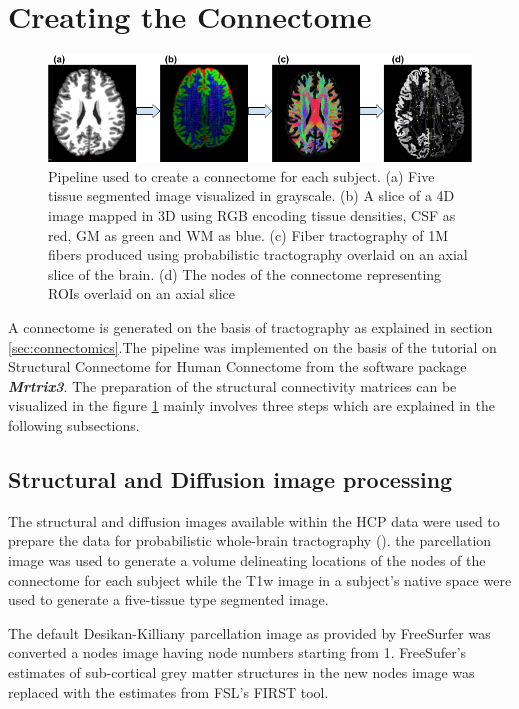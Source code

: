 \documentclass[msthesis.tex]{subfiles}
\begin{document}
\section{Creating the Connectome}
\begin{figure}
    \centering
    \includegraphics[width=\textwidth]{images/Preprocessing_pipeline.png}
    \caption{Pipeline used to create a connectome for each subject. (a) Five tissue segmented image visualized in grayscale. (b) A slice of a 4D image mapped in 3D using RGB encoding tissue densities, CSF as red, GM as green and WM as blue. (c) Fiber tractography of 1M fibers produced using probabilistic tractography overlaid on an axial slice of the brain. (d) The nodes of the connectome representing ROIs overlaid on an axial slice}
    \label{fig:preproc}
\end{figure}
A connectome is generated on the basis of tractography as explained in section \ref{sec:connectomics}.The pipeline was implemented on the basis of the tutorial on Structural Connectome for Human Connectome from the software package \textbf{\textit{Mrtrix3}}. The preparation of the structural connectivity matrices can be visualized in the figure \ref{fig:preproc} mainly involves three steps which are explained in the following subsections.

\subsection{Structural  and Diffusion image processing}
\label{subsec:struct_diff}

The structural and diffusion images available within the HCP data were used to prepare the data for probabilistic whole-brain tractography (\cite{parker2003framework}). the parcellation image was used to generate a volume delineating locations of the nodes of the connectome for each subject while the T1w image in a subject's native space were used to generate a five-tissue type segmented image.

The default Desikan-Killiany parcellation image as provided by FreeSurfer was converted a nodes image having node numbers starting from 1. FreeSufer's estimates of sub-cortical grey matter structures in the new nodes image was replaced with the estimates from FSL's FIRST tool. 
\end{document}
